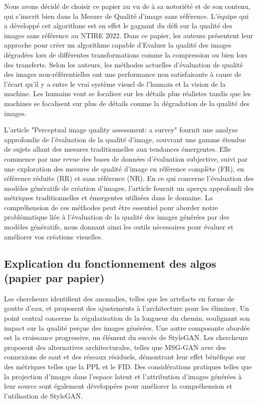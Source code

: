 \documentclass{ieeeaccess}
\begin{document}
 Nous avons décidé de choisir ce papier au vu de à sa notoriété et de son contenu, qui s’inscrit bien dans la Mesure de Qualité d’image sans référence. L’équipe qui a développé cet algorithme est en effet le gagnant du défi sur la qualité des images sans référence au NTIRE 2022. Dans ce papier, les auteurs présentent leur approche pour créer un algorithme capable d’Evaluer la qualité des images dégradées lors de différentes transformations comme la compression ou bien lors des transferts. Selon les auteurs, les méthodes actuelles d’évaluation de qualité des images non-référentielles ont une performance non satisfaisante à cause de l’écart qu’il y a entre le vrai système visuel de l’humain et la vision de la machine. Les humains vont se focaliser sur les détails plus réalistes tandis que les machines se focalisent sur plus de détails comme la dégradation de la qualité des images.  

 L'article "Perceptual image quality assessment: a survey" fournit une analyse approfondie de l'évaluation de la qualité d'image, couvrant une gamme étendue de sujets allant des mesures traditionnelles aux tendances émergentes. Elle commence par une revue des bases de données d'évaluation subjective, suivi par une exploration des mesures de qualité d'image en référence complète (FR), en référence réduite (RR) et sans référence (NR). En ce qui concerne l'évaluation des modèles génératifs de création d'images, l'article fournit un aperçu approfondi des métriques traditionnelles et émergentes utilisées dans le domaine. La compréhension de ces méthodes peut être essentiel pour aborder notre problématique liée à l'évaluation de la qualité des images générées par des modèles génératifs, nous donnant ainsi les outils nécessaires pour évaluer et améliorer vos créations visuelles. 

\subsection{Explication du fonctionnement des algos (papier par papier)}

 Les chercheurs identifient des anomalies, telles que les artefacts en forme de goutte d'eau, et proposent des ajustements à l'architecture pour les éliminer. Un point central concerne la régularisation de la longueur du chemin, soulignant son impact sur la qualité perçue des images générées. Une autre composante abordée est la croissance progressive, un élément du succès de StyleGAN. Les chercheurs proposent des alternatives architecturales, telles que MSG-GAN avec des connexions de saut et des réseaux résiduels, démontrant leur effet bénéfique sur des métriques telles que la PPL et le FID. Des considérations pratiques telles que la projection d'images dans l'espace latent et l'attribution d'images générées à leur source sont également développées pour améliorer la compréhension et l'utilisation de StyleGAN.
\end{document}
